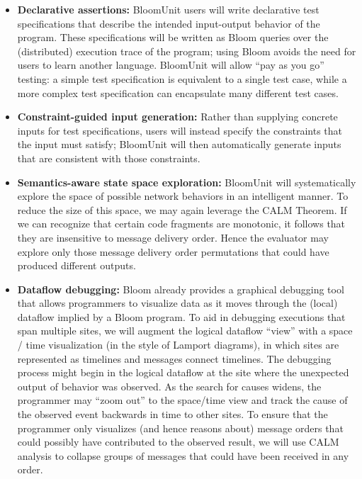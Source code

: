 \begin{itemize}
\item \textbf{Declarative assertions:}
BloomUnit users will write declarative test specifications that describe the 
intended input-output behavior of the program. These specifications will be 
written 
as Bloom queries over the (distributed) execution trace of the program; 
using Bloom avoids the need for users to learn another language. 
BloomUnit will allow ``pay as you go'' testing: a simple test specification 
is equivalent to a single test case, while a more complex test specification 
can encapsulate many different test cases.


\item \textbf{Constraint-guided input generation:}
Rather than supplying concrete inputs for test specifications, users will 
instead 
specify the constraints that the input must satisfy; BloomUnit will then 
automatically generate inputs that are consistent with those constraints.

\item \textbf{Semantics-aware state space exploration:}
  BloomUnit will systematically explore the space of possible network behaviors
  in an intelligent manner. To reduce the size of this space, we may again
  leverage the CALM Theorem.  If we can recognize that certain code fragments
  are monotonic, it follows that they are insensitive to message delivery order.
  Hence the evaluator may explore only those message delivery order permutations
  that could have produced different outputs.

\item \textbf{Dataflow debugging:}  Bloom already provides a graphical debugging tool that allows programmers
to visualize data as it moves through the (local) dataflow implied by a Bloom program.  To aid in debugging
executions that span multiple sites,  we will augment the logical dataflow ``view'' with a space / time visualization
(in the style of Lamport diagrams), in which sites are represented as timelines and messages connect timelines.
The debugging process might begin in the logical dataflow at the site where the unexpected output of behavior was observed.
As the search for causes widens, the programmer may ``zoom out'' to the space/time view and track the cause of the observed
event backwards in time to other sites.  To ensure that the programmer only visualizes (and hence reasons about) message orders
that could possibly have contributed to the observed result, we will use CALM analysis to collapse groups of messages that
could have been received in any order.  
\end{itemize}

